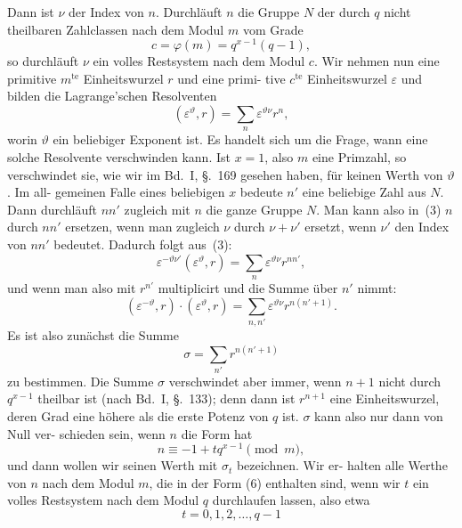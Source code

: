 \documentclass[12pt,a4paper]{article}
\theoremstyle{plain}
\theoremstyle{definition}
\theoremstyle{remark}
\begin{document}
Dann ist $\nu$ der Index von $n$. Durchläuft $n$ die Gruppe $N$
der durch $q$ nicht theilbaren Zahlclassen nach dem Modul $m$
vom Grade
\begin{equation}\tag{2}
c = \varphi(m) = q^{x-1}(q-1),
\end{equation}
so durchläuft $\nu$ ein volles Restsystem nach dem Modul $c$. Wir
nehmen nun eine primitive $m^{\text{te}}$ Einheitswurzel $r$ und eine primi-
tive $c^{\text{te}}$ Einheitswurzel $\varepsilon$ und bilden die Lagrange'schen
Resolventen
\begin{equation}\tag{3}
(\varepsilon^\vartheta, r) = \sum_n \varepsilon^{\vartheta \nu} r^n,
\end{equation}
worin $\vartheta$ ein beliebiger Exponent ist. Es handelt sich um die
Frage, wann eine solche Resolvente verschwinden kann. Ist
$x = 1$, also $m$ eine Primzahl, so verschwindet sie, wie wir im
Bd.~I, \S.~169 gesehen haben, für keinen Werth von $\vartheta$. Im all-
gemeinen Falle eines beliebigen $x$ bedeute $n'$ eine beliebige Zahl
aus $N$. Dann durchläuft $nn'$ zugleich mit $n$ die ganze Gruppe $N$.
Man kann also in~(3) $n$ durch $nn'$ ersetzen, wenn man zugleich
$\nu$ durch $\nu + \nu'$ ersetzt, wenn $\nu'$ den Index von $nn'$ bedeutet.
Dadurch folgt aus~(3):
\[
\varepsilon^{-\vartheta \nu'} (\varepsilon^\vartheta, r) = \sum_n \varepsilon^{\vartheta \nu} r^{nn'},
\]
und wenn man also mit $r^{n'}$ multiplicirt und die Summe über $n'$
nimmt:
\begin{equation}\tag{4}
(\varepsilon^{-\vartheta}, r) \cdot (\varepsilon^\vartheta, r) = \sum_{n,n'} \varepsilon^{\vartheta \nu} r^{n(n'+1)}.
\end{equation}
Es ist also zunächst die Summe
\begin{equation}\tag{5}
\sigma = \sum_{n'} r^{n(n'+1)}
\end{equation}
zu bestimmen. Die Summe $\sigma$ verschwindet aber immer, wenn
$n + 1$ nicht durch $q^{x-1}$ theilbar ist (nach Bd.~I, \S.~133); denn
dann ist $r^{n+1}$ eine Einheitswurzel, deren Grad eine höhere als
die erste Potenz von $q$ ist. $\sigma$ kann also nur dann von Null ver-
schieden sein, wenn $n$ die Form hat
\begin{equation}\tag{6}
n \equiv -1 + tq^{x-1} \pmod{m},
\end{equation}
und dann wollen wir seinen Werth mit $\sigma_t$ bezeichnen. Wir er-
halten alle Werthe von $n$ nach dem Modul $m$, die in der Form
(6) enthalten sind, wenn wir $t$ ein volles Restsystem nach dem
Modul $q$ durchlaufen lassen, also etwa
\begin{equation}\tag{7}
t = 0, 1, 2, \ldots, q-1
\end{equation}
\end{document}
